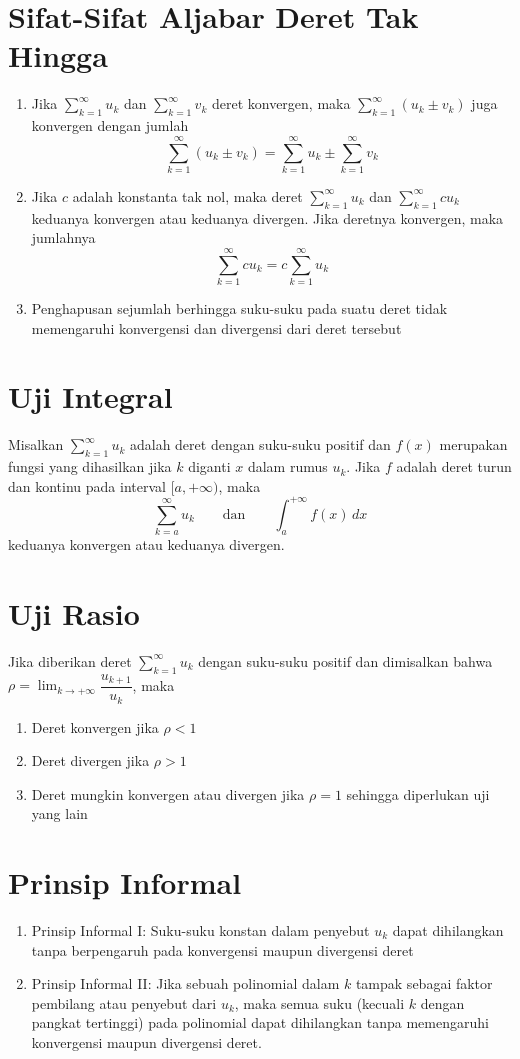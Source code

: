 \documentclass{article}
\begin{document}
\section{Sifat-Sifat Aljabar Deret Tak Hingga}
\begin{enumerate}
	\item Jika $\displaystyle \sum_{k=1}^\infty u_k$ dan $\displaystyle \sum_{k=1}^\infty v_k$ deret konvergen, maka $\displaystyle \sum_{k=1}^\infty (u_k\pm v_k)$ juga konvergen dengan jumlah 
$$ \sum_{k=1}^\infty (u_k\pm v_k) = \sum_{k=1}^\infty u_k \pm \sum_{k=1}^\infty v_k $$
	\item Jika $c$ adalah konstanta tak nol, maka deret $\displaystyle \sum_{k=1}^\infty u_k$ dan $\displaystyle \sum_{k=1}^\infty cu_k$ keduanya konvergen atau keduanya divergen. Jika deretnya konvergen, maka jumlahnya
$$ \sum_{k=1}^\infty cu_k = c \sum_{k=1}^\infty u_k   $$
\item Penghapusan sejumlah berhingga suku-suku pada suatu deret tidak memengaruhi konvergensi dan divergensi dari deret tersebut
\end{enumerate}
\section{Uji Integral}
Misalkan $\displaystyle \sum_{k=1}^\infty u_k$ adalah deret dengan suku-suku positif dan $f(x)$ merupakan fungsi yang dihasilkan jika $k$ diganti $x$ dalam rumus $u_k$. Jika $f$ adalah deret turun dan kontinu pada interval $[a,+\infty)$, maka 
$$ \sum_{k=a}^\infty u_k \qquad\text{dan}\qquad \int_a^{+\infty} f(x)\, dx $$
keduanya konvergen atau keduanya divergen. 
\section{Uji Rasio}
Jika diberikan deret $\displaystyle \sum_{k=1}^\infty u_k$ dengan suku-suku positif dan dimisalkan bahwa $\displaystyle \rho = \lim_{k\rightarrow +\infty} \dfrac{u_{k+1}}{u_k}$, maka 
\begin{enumerate}
	\item Deret konvergen jika $\rho<1$
	\item Deret divergen jika $\rho>1$
	\item Deret mungkin konvergen atau divergen jika $\rho=1$ sehingga diperlukan uji yang lain
\end{enumerate}
\section{Prinsip Informal}
\begin{enumerate}
	\item Prinsip Informal I: Suku-suku konstan dalam penyebut $u_k$ dapat dihilangkan tanpa berpengaruh pada konvergensi maupun divergensi deret
	\item Prinsip Informal II: Jika sebuah polinomial dalam $k$ tampak sebagai faktor pembilang atau penyebut dari $u_k$, maka semua suku (kecuali $k$ dengan pangkat tertinggi) pada polinomial dapat dihilangkan tanpa memengaruhi konvergensi maupun divergensi deret.
\end{enumerate}
\end{document}
